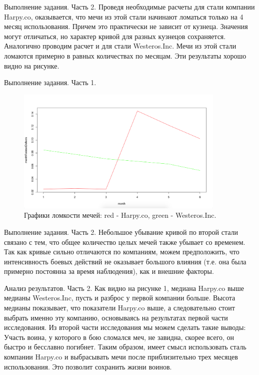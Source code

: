 \documentclass{beamer}
\begin{document}
\begin{frame}{Выполнение задания. Часть 2.}
Проведя необходимые расчеты для стали компании Harpy.co, оказывается, что мечи из этой стали начинают ломаться только на 4 месяц использования. Причем это практически не зависит от кузнеца. Значения могут отличаться, но характер кривой для разных кузнецов сохраняется.
Аналогично проводим расчет и для стали Westeros.Inc. Мечи из этой стали ломаются примерно в равных количествах по месяцам. 
Эти результаты хорошо видно на рисунке.
\end{frame}

\begin{frame}{Выполнение задания. Часть 1.}	
	\begin{figure}[h]
		\includegraphics[width=100mm]{grafff}
		\caption{Графики ломкости мечей: red - Harpy.co, green -  Westeros.Inc.}
		\label{grafff}
	\end{figure}
\end{frame}

\begin{frame}{Выполнение задания. Часть 2.}
Небольшое убывание кривой по второй стали связано с тем, что общее количество целых мечей также убывает со временем.
Так как кривые сильно отличаются по компаниям, можем предположить, что интенсивность боевых действий не оказывает большого влияния (т.е. она была примерно постоянна за время наблюдения), как и внешние факторы.
\end{frame}



 

\begin{frame}{Анализ результатов. Часть 2.}
Как видно на рисунке 1, медиана Harpy.co выше медианы Westeros.Inc, пусть и разброс у первой компании больше. Высота медианы показывает, что показатели Harpy.co выше, а следовательно стоит выбрать именно эту компанию, основываясь на результатах первой части исследования. 
Из второй части исследования мы можем сделать такие выводы: 
Участь воина, у которого в бою сломался меч, не завидна, скорее всего, он быстро и бесславно погибнет. Таким образом, имеет смысл использовать сталь компании Harpy.co и выбрасывать мечи после приблизительно трех месяцев использования. Это позволит сохранить жизни воинов.

\end{frame}
\end{document}
